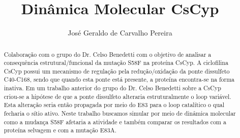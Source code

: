 \documentclass[11pt]{report}
\title{Dinâmica Molecular CsCyp}
\author{José Geraldo de Carvalho Pereira}
\begin{document}
\maketitle

\begin{abstract}
	Colaboração com o grupo do Dr. Celso Benedetti com o objetivo de analisar a consequência estrutural/funcional da mutação S58F na proteína CsCyp. A ciclofilina CsCyp possui um mecanismo de regulação pela redução/oxidação da ponte dissulfeto C40-C168, sendo que quando esta ponte está presente, a proteína encontra-se na forma inativa. Em um trabalho anterior do grupo do Dr. Celso Benedetti sobre a CsCyp criou-se a hipótese de que a ponte dissulfeto alteraria estruturalmente o loop variável. Esta alteração seria então propagada por meio do E83 para o loop catalítico o qual fecharia o sítio ativo.
	Neste trabalho buscamos simular por meio de dinâmica molecular como a mudança S58F afetaria a atividade e também comparar os resultados com a proteína selvagem e com a mutação E83A.
\end{abstract}






\end{document}
